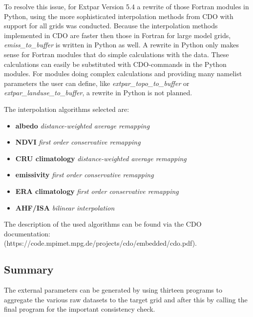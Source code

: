 \documentclass[a4paper,10pt,DIV14,BCOR1cm,titlepage,twoside]{scrartcl}
\begin{document}
\noindent To resolve this issue, for Extpar Version 5.4 a rewrite of those Fortran modules in Python, using the more sophisticated interpolation methods
from CDO with support for all grids was conducted.  Because the interpolation methods implemented in CDO are faster then those
in Fortran for large model grids, \textit{emiss\_to\_buffer} is written in Python as well. A rewrite in Python only makes sense for Fortran modules that do simple calculations with the data. These calculations can easily be substituted with CDO-commands in the Python modules.
For modules doing complex calculations and providing many namelist parameters the user can define, like \textit{extpar\_topo\_to\_buffer} or \textit{extpar\_landuse\_to\_buffer}, a rewrite in Python is not planned.
\par\medskip\noindent

\noindent The interpolation algorithms selected are:

\begin{itemize}
\item \textbf{albedo} \textit{distance-weighted average remapping}
\item \textbf{NDVI} \textit{first order conservative remapping}
\item \textbf{CRU climatology} \textit{distance-weighted average remapping}
\item \textbf{emissivity} \textit{first order conservative remapping}
\item \textbf{ERA climatology} \textit{first order conservative remapping}
\item \textbf{AHF/ISA} \textit{bilinear interpolation}
\end{itemize}

The description of the used algorithms can be found via the CDO
documentation: 
\\
(https://code.mpimet.mpg.de/projects/cdo/embedded/cdo.pdf).
\\



\subsection{Summary}\label{Summary}
The external parameters can be generated by using thirteen programs to aggregate the various raw datasets to the target grid and after this by calling the final program for the important consistency check.
\end{document}
